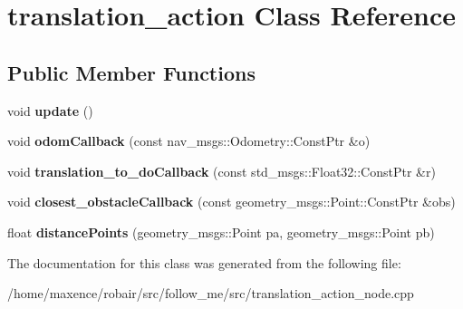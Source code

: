 \hypertarget{classtranslation__action}{}\section{translation\+\_\+action Class Reference}
\label{classtranslation__action}
\subsection*{Public Member Functions}
\begin{DoxyCompactItemize}
\item 
void {\bfseries update} ()\hypertarget{classtranslation__action_aa3ca646683b981a0807605aeddfc9b81}{}\label{classtranslation__action_aa3ca646683b981a0807605aeddfc9b81}

\item 
void {\bfseries odom\+Callback} (const nav\+\_\+msgs\+::\+Odometry\+::\+Const\+Ptr \&o)\hypertarget{classtranslation__action_a4a456d4c183e92b1886e711d60a817ca}{}\label{classtranslation__action_a4a456d4c183e92b1886e711d60a817ca}

\item 
void {\bfseries translation\+\_\+to\+\_\+do\+Callback} (const std\+\_\+msgs\+::\+Float32\+::\+Const\+Ptr \&r)\hypertarget{classtranslation__action_a157116f7a244bd7de177f5122b29baa1}{}\label{classtranslation__action_a157116f7a244bd7de177f5122b29baa1}

\item 
void {\bfseries closest\+\_\+obstacle\+Callback} (const geometry\+\_\+msgs\+::\+Point\+::\+Const\+Ptr \&obs)\hypertarget{classtranslation__action_ae3ee28b233a8cc05c55b53809b158cbf}{}\label{classtranslation__action_ae3ee28b233a8cc05c55b53809b158cbf}

\item 
float {\bfseries distance\+Points} (geometry\+\_\+msgs\+::\+Point pa, geometry\+\_\+msgs\+::\+Point pb)\hypertarget{classtranslation__action_a690642e927c261040c2ca0f5c83069cb}{}\label{classtranslation__action_a690642e927c261040c2ca0f5c83069cb}

\end{DoxyCompactItemize}


The documentation for this class was generated from the following file\+:\begin{DoxyCompactItemize}
\item 
/home/maxence/robair/src/follow\+\_\+me/src/translation\+\_\+action\+\_\+node.\+cpp\end{DoxyCompactItemize}
